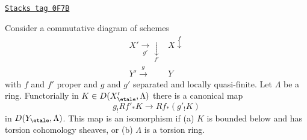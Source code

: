 \begin{lemma}
\label{more-etale-lemma-shriek-proper-and-open}
\href{https://stacks.math.columbia.edu/tag/0F7B}{\texttt{Stacks tag 0F7B}}

Consider a commutative diagram of schemes
$$
\begin{array}{cc}X' \underset{g'}{\longrightarrow}\underset{f'}{\downarrow} & X \overset{f}{\downarrow} \\ Y' \overset{g}{\longrightarrow} & Y\end{array}
$$
with $f$ and $f'$ proper and $g$ and $g'$ separated and locally quasi-finite.
Let $\Lambda$ be a ring. Functorially in $K \in D(X'_\etale, \Lambda)$
there is a canonical map
$$
g_!Rf'_*K \longrightarrow Rf_*(g'_!K)
$$
in $D(Y_\etale, \Lambda)$. This map is an isomorphism if
(a) $K$ is bounded below and has torsion cohomology sheaves, or
(b) $\Lambda$ is a torsion ring.
\end{lemma}

